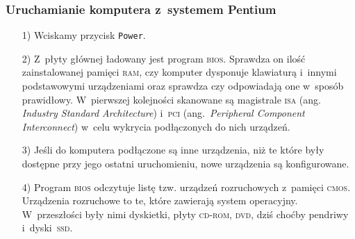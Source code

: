 \documentclass[10pt,t]{beamer}
\begin{document}
\begin{frame}
  \frametitle{Uruchamianie komputera z~systemem Pentium}


  \begin{itemize}

  \item[1)] Wciskamy przycisk \texttt{Power}.



  \item[2)] Z~płyty głównej ładowany jest program \textsc{bios}. Sprawdza on
    ilość zainstalowanej pamięci \textsc{ram}, czy komputer dysponuje
    klawiaturą i~innymi podstawowymi urządzeniami oraz sprawdza czy
    odpowiadają one w~sposób prawidłowy. W~pierwszej kolejności skanowane
    są magistrale \textsc{isa} (ang. \textit{Industry Standard
      Architecture}) i~\textsc{pci} (ang.~\textit{Peripheral Component
      Interconnect}) w~celu wykrycia podłączonych do nich urządzeń.



  \item[3)] Jeśli do komputera podłączone są inne urządzenia, niż te które
    były dostępne przy jego ostatni uruchomieniu, nowe urządzenia są
    konfigurowane.



  \item[4)] Program \textsc{bios} odczytuje listę tzw. urządzeń rozruchowych
    z~pamięci \textsc{cmos}. Urządzenia rozruchowe to te, które zawierają
    system operacyjny. W~przeszłości były nimi dyskietki, płyty
    \textsc{cd}-\textsc{rom}, \textsc{dvd}, dziś choćby pendriwy
    i~dyski~\textsc{ssd}.

  \end{itemize}

\end{frame}
\end{document}

